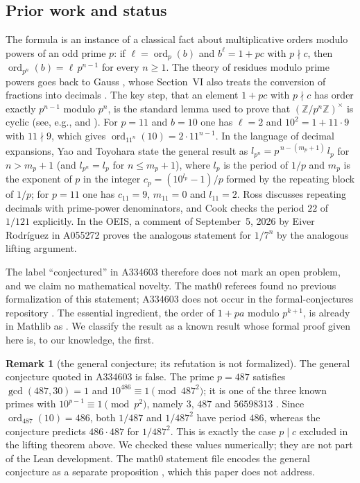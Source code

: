 \documentclass[11pt]{amsart}
\theoremstyle{plain}
\theoremstyle{definition}
\newtheorem{remark}[theorem]{Remark}
\newcommand{\Z}{\mathbb{Z}}
\newcommand{\ord}{\operatorname{ord}}
\begin{document}
\subsection*{Prior work and status}
The formula is an instance of a classical fact about multiplicative orders modulo powers of an odd prime $p$: if $\ell=\ord_p(b)$ and $b^\ell=1+pc$ with $p\nmid c$, then $\ord_{p^n}(b)=\ell\,p^{n-1}$ for every $n\ge1$.
The theory of residues modulo prime powers goes back to Gauss \cite[Art.~82 ff.]{Gauss}, whose Section~VI also treats the conversion of fractions into decimals \cite[Art.~312 ff.]{Gauss}.
The key step, that an element $1+pc$ with $p\nmid c$ has order exactly $p^{n-1}$ modulo $p^n$, is the standard lemma used to prove that $(\Z/p^n\Z)^\times$ is cyclic (see, e.g., \cite[Ch.~4]{IR} and \cite[\S2.8]{NZM}).
For $p=11$ and $b=10$ one has $\ell=2$ and $10^2=1+11\cdot9$ with $11\nmid 9$, which gives $\ord_{11^n}(10)=2\cdot11^{n-1}$.
In the language of decimal expansions, Yao and Toyohara \cite[Theorem~2.1]{YT} state the general result as $l_{p^n}=p^{\,n-(m_p+1)}\,l_p$ for $n>m_p+1$ (and $l_{p^n}=l_p$ for $n\le m_p+1$), where $l_p$ is the period of $1/p$ and $m_p$ is the exponent of $p$ in the integer $c_p=(10^{l_p}-1)/p$ formed by the repeating block of $1/p$; for $p=11$ one has $c_{11}=9$, $m_{11}=0$ and $l_{11}=2$.
Ross \cite{Ross} discusses repeating decimals with prime-power denominators, and Cook \cite{Cook} checks the period $22$ of $1/121$ explicitly.
In the OEIS, a comment of September~5, 2026 by Eiver Rodr\'iguez in A055272 \cite{A055272} proves the analogous statement for $1/7^n$ by the analogous lifting argument.

The label ``conjectured'' in A334603 therefore does not mark an open problem, and we claim no mathematical novelty.
The math0 referees found no previous formalization of this statement; A334603 does not occur in the formal-conjectures repository \cite{FC}.
The essential ingredient, the order of $1+pa$ modulo $p^{k+1}$, is already in Mathlib \cite{Mathlib} as .
We classify the result as a known result whose formal proof given here is, to our knowledge, the first.

\begin{remark}[the general conjecture; its refutation is not formalized]\label{rem:general}
The general conjecture quoted in A334603 is false.
The prime $p=487$ satisfies $\gcd(487,30)=1$ and $10^{486}\equiv1\pmod{487^2}$; it is one of the three known primes with $10^{p-1}\equiv1\pmod{p^2}$, namely $3$, $487$ and $56598313$ \cite{A045616}.
Since $\ord_{487}(10)=486$, both $1/487$ and $1/487^2$ have period $486$, whereas the conjecture predicts $486\cdot487$ for $1/487^2$.
This is exactly the case $p\mid c$ excluded in the lifting theorem above.
We checked these values numerically; they are not part of the Lean development.
The math0 statement file encodes the general conjecture as a separate proposition , which this paper does not address.
\end{remark}
\end{document}
